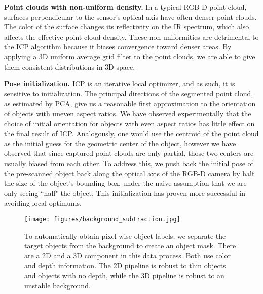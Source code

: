\documentclass[letterpaper, 10 pt, conference]{ieeeconf}  %
\newcommand{\myparagraph}[1]{\vspace{0.1in}\noindent\textbf{#1}}
\begin{document}
\myparagraph{Point clouds with non-uniform density.}
In a typical RGB-D point cloud, surfaces perpendicular to the sensor's optical axis have often denser point clouds. The color of the surface changes its reflectivity on the IR spectrum, which also affects the effective point cloud density.
These non-uniformities are detrimental to the ICP algorithm because it biases convergence toward denser areas.  By applying a 3D uniform average grid filter to the point clouds, we are able to give them consistent distributions in 3D space.


\myparagraph{Pose initialization.} 
ICP is an iterative local optimizer, and as such, it is sensitive to initialization.
The principal directions of the segmented point cloud, as estimated by PCA, give us a reasonable first approximation to the orientation of objects with uneven aspect ratios.
We have observed experimentally that the choice of initial orientation for objects with even aspect ratios has little effect on the final result of ICP.
Analogously, one would use the centroid of the point cloud as the initial guess for the geometric center of the object, however we have observed that since captured point clouds are only partial, those two centers are usually biased from each other.
To address this, we push back the initial pose of the pre-scanned object back along the optical axis of the RGB-D camera by half the size of the object's bounding box, under the naive assumption that we are only seeing ``half" the object. This initialization has proven more successful in avoiding local optimums.

\begin{figure}[t]
\vspace{2mm}
\centering
  \texttt{[image: figures/background\_subtraction.jpg]}
  \vspace{-1mm}
  \caption{To automatically obtain pixel-wise object labels, we separate the target objects from the background to create an object mask. There are a 2D and a 3D component in this data process. Both use color and depth information. The 2D pipeline is robust to thin objects and objects with no depth, while the 3D pipeline is robust to an unstable background. 
  }
\vspace{-4mm}
\end{figure}
\end{document}
